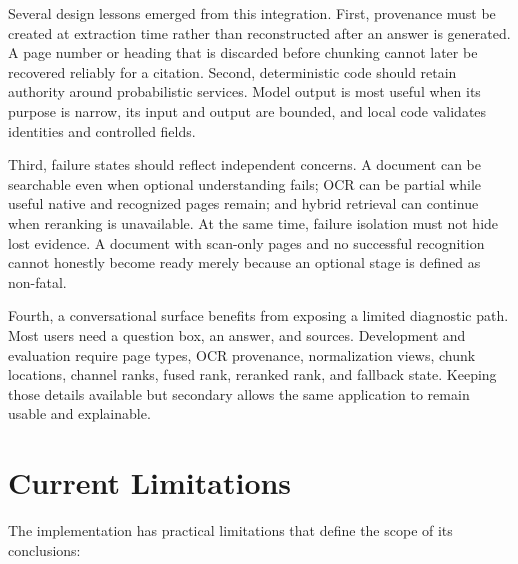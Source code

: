 Several design lessons emerged from this integration. First, provenance must be created at extraction time rather than reconstructed after an answer is generated. A page number or heading that is discarded before chunking cannot later be recovered reliably for a citation. Second, deterministic code should retain authority around probabilistic services. Model output is most useful when its purpose is narrow, its input and output are bounded, and local code validates identities and controlled fields.

Third, failure states should reflect independent concerns. A document can be searchable even when optional understanding fails; OCR can be partial while useful native and recognized pages remain; and hybrid retrieval can continue when reranking is unavailable. At the same time, failure isolation must not hide lost evidence. A document with scan-only pages and no successful recognition cannot honestly become ready merely because an optional stage is defined as non-fatal.

Fourth, a conversational surface benefits from exposing a limited diagnostic path. Most users need a question box, an answer, and sources. Development and evaluation require page types, OCR provenance, normalization views, chunk locations, channel ranks, fused rank, reranked rank, and fallback state. Keeping those details available but secondary allows the same application to remain usable and explainable.

\section{Current Limitations}

The implementation has practical limitations that define the scope of its conclusions:


